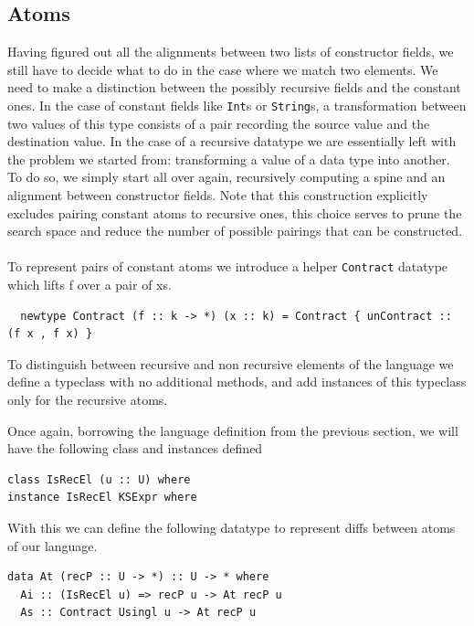 \documentclass[11pt, titlepage]{article}
\begin{document}
\subsection{Atoms}\label{atoms}

Having figured out all the alignments between two lists of constructor
fields, we still have to decide what to do in the case where we match two
elements. We need to make a distinction between the possibly
recursive fields and the constant ones.
In the case of constant fields
like \texttt{Int}s or \texttt{String}s, a transformation between two
values of this type consists of a pair recording the source value and the
destination value. In the case of a recursive datatype we are
essentially left with the problem we started from: transforming a value
of a data type into another. To do so, we simply start all over again,
recursively computing a spine and an alignment between constructor
fields. Note that this construction explicitly excludes pairing constant atoms 
to recursive ones, this choice serves to prune the search space and reduce the 
number of possible pairings that can be constructed.
\\\\
To represent pairs of constant atoms we introduce a helper \texttt{Contract} datatype which 
lifts f over a pair of xs.

\begin{verbatim}
  newtype Contract (f :: k -> *) (x :: k) = Contract { unContract :: (f x , f x) }
\end{verbatim}

To distinguish between recursive and non recursive elements of the language we 
define a typeclass with no additional methods, and add instances of this typeclass only for the recursive atoms.

Once again, borrowing the language definition from the previous section, we will have the following 
class and instances defined
\begin{verbatim}
class IsRecEl (u :: U) where
instance IsRecEl KSExpr where
\end{verbatim}

With this we can define the following datatype to represent diffs between atoms of our language.
\begin{verbatim}
data At (recP :: U -> *) :: U -> * where
  Ai :: (IsRecEl u) => recP u -> At recP u
  As :: Contract Usingl u -> At recP u
\end{verbatim}
\end{document}
